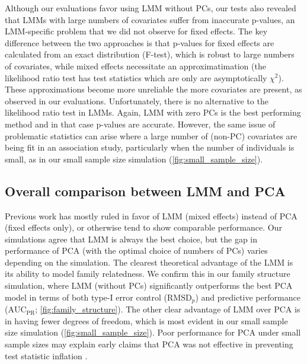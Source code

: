 \documentclass[11pt]{article}
\newcommand{\rmsd}{\text{RMSD}_p}
\newcommand{\auc}{\text{AUC}_\text{PR}}
\begin{document}
Although our evaluations favor using LMM without PCs, our tests also revealed that LMMs with large numbers of covariates suffer from inaccurate p-values, an LMM-specific problem that we did not observe for fixed effects.
The key difference between the two approaches is that p-values for fixed effects are calculated from an exact distribution (F-test), which is robust to large numbers of covariates, while mixed effects necessitate an approximatimation (the likelihood ratio test has test statistics which are only are asymptotically $\chi^2$).
These approximations become more unreliable the more covariates are present, as observed in our evaluations.
Unfortunately, there is no alternative to the likelihood ratio test in LMMs.
Again, LMM with zero PCs is the best performing method and in that case p-values are accurate.
However, the same issue of problematic statistics can arise where a large number of (non-PC) covariates are being fit in an association study, particularly when the number of individuals is small, as in our small sample size simulation (\cref{fig:small_sample_size}).

\subsection{Overall comparison between LMM and PCA}

Previous work has mostly ruled in favor of LMM (mixed effects) instead of PCA (fixed effects only), or otherwise tend to show comparable performance.
Our simulations agree that LMM is always the best choice, but the gap in performance of PCA (with the optimal choice of numbers of PCs) varies depending on the simulation.
The clearest theoretical advantage of the LMM is its ability to model family relatedness.
We confirm this in our family structure simulation, where LMM (without PCs) significantly outperforms the best PCA model in terms of both type-I error control ($\rmsd$) and predictive performance ($\auc$; \cref{fig:family_structure}).
The other clear advantage of LMM over PCA is in having fewer degrees of freedom, which is most evident in our small sample size simulation (\cref{fig:small_sample_size}).
Poor performance for PCA under small sample sizes may explain early claims that PCA was not effective in preventing test statistic inflation \citep{epstein_simple_2007, kimmel_randomization_2007, luca_use_2008}.
\end{document}
